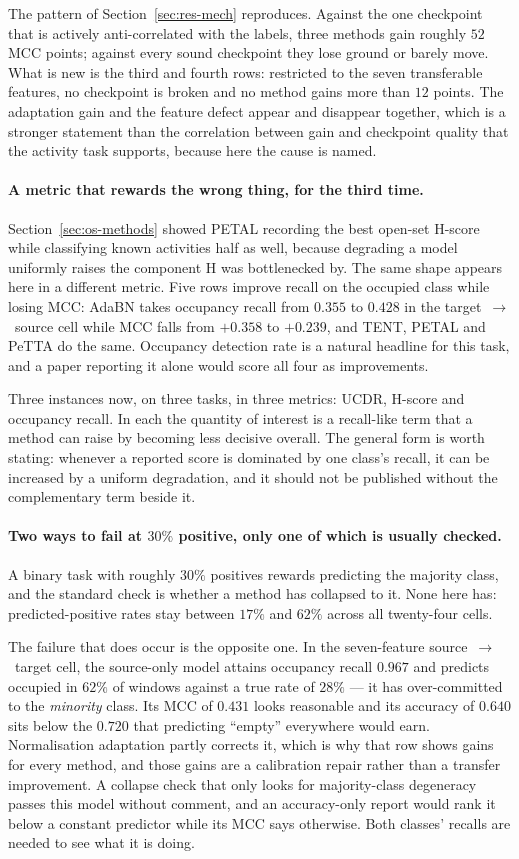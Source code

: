 The pattern of Section~\ref{sec:res-mech} reproduces. Against the one checkpoint that is
actively anti-correlated with the labels, three methods gain roughly $52$ MCC points;
against every sound checkpoint they lose ground or barely move. What is new is the third
and fourth rows: restricted to the seven transferable features, no checkpoint is broken
and no method gains more than $12$ points. The adaptation gain and the feature defect
appear and disappear together, which is a stronger statement than the correlation between
gain and checkpoint quality that the activity task supports, because here the cause is
named.

\paragraph{A metric that rewards the wrong thing, for the third time.}
Section~\ref{sec:os-methods} showed PETAL recording the best open-set H-score while
classifying known activities half as well, because degrading a model uniformly raises the
component H was bottlenecked by. The same shape appears here in a different metric. Five
rows improve recall on the occupied class while losing MCC: AdaBN takes occupancy recall
from $0.355$ to $0.428$ in the target~$\to$~source cell while MCC falls from $+0.358$ to
$+0.239$, and TENT, PETAL and PeTTA do the same. Occupancy detection rate is a natural
headline for this task, and a paper reporting it alone would score all four as
improvements.

Three instances now, on three tasks, in three metrics: UCDR, H-score and occupancy recall.
In each the quantity of interest is a recall-like term that a method can raise by becoming
less decisive overall. The general form is worth stating: whenever a reported score is
dominated by one class's recall, it can be increased by a uniform degradation, and it
should not be published without the complementary term beside it.

\paragraph{Two ways to fail at $30\%$ positive, only one of which is usually checked.}
A binary task with roughly $30\%$ positives rewards predicting the majority class, and the
standard check is whether a method has collapsed to it. None here has: predicted-positive
rates stay between $17\%$ and $62\%$ across all twenty-four cells.

The failure that does occur is the opposite one. In the seven-feature
source~$\to$~target cell, the source-only model attains occupancy recall $0.967$ and
predicts occupied in $62\%$ of windows against a true rate of $28\%$ --- it has
over-committed to the \emph{minority} class. Its MCC of $0.431$ looks reasonable and its
accuracy of $0.640$ sits below the $0.720$ that predicting ``empty'' everywhere would
earn. Normalisation adaptation partly corrects it, which is why that row shows gains for
every method, and those gains are a calibration repair rather than a transfer improvement.
A collapse check that only looks for majority-class degeneracy passes this model without
comment, and an accuracy-only report would rank it below a constant predictor while its
MCC says otherwise. Both classes' recalls are needed to see what it is doing.
